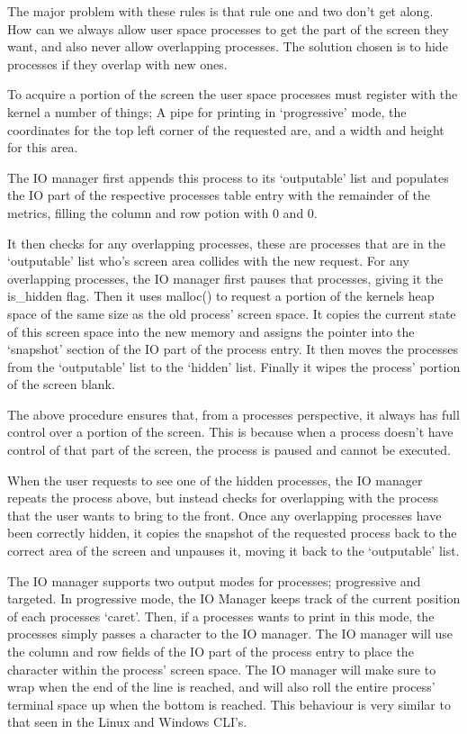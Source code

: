 \documentclass[a4paper]{report}
\begin{document}
The major problem with these rules is that rule one and two don't get along. How can we always allow user space processes to get the part of the screen they want, and also never allow overlapping processes. The solution chosen is to hide processes if they overlap with new ones.

To acquire a portion of the screen the user space processes must register with the kernel a number of things; A pipe for printing in `progressive' mode, the coordinates for the top left corner of the requested are, and a width and height for this area.

The IO manager first appends this process to its `outputable' list and populates the IO part of the respective processes table entry with the remainder of the metrics, filling the column and row potion with 0 and 0.

It then checks for any overlapping processes, these are processes that are in the `outputable' list who's screen area collides with the new request. For any overlapping processes, the IO manager first pauses that processes, giving it the is\_hidden flag. Then it uses malloc() to request a portion of the kernels heap space of the same size as the old process' screen space. It copies the current state of this screen space into the new memory and assigns the pointer into the `snapshot' section of the IO part of the process entry. It then moves the processes from the `outputable' list to the `hidden' list. Finally it wipes the process' portion of the screen blank.

The above procedure ensures that, from a processes perspective, it always has full control over a portion of the screen. This is because when a process doesn't have control of that part of the screen, the process is paused and cannot be executed.

When the user requests to see one of the hidden processes, the IO manager repeats the process above, but instead checks for overlapping with the process that the user wants to bring to the front. Once any overlapping processes have been correctly hidden, it copies the snapshot of the requested process back to the correct area of the screen and unpauses it, moving it back to the `outputable' list.

The IO manager supports two output modes for processes; progressive and targeted. In progressive mode, the  IO Manager keeps track of the current position of each processes `caret'. Then, if a processes wants to print in this mode, the processes simply passes a character to the IO manager. The IO manager will use the column and row fields of the IO part of the process entry to place the character within the process' screen space. The IO manager will make sure to wrap when the end of the line is reached, and will also roll the entire process' terminal space up when the bottom is reached. This behaviour is very similar to that seen in the Linux and Windows CLI's.
\end{document}
